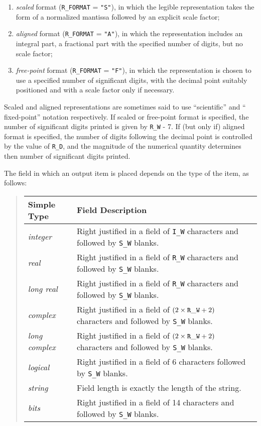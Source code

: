 \documentclass[a4paper]{article}
\def\A{\lstinline[language=AlgolW,style=ReferenceManual]}
\def\T#1{\textit{#1}}
\begin{document}
\begin{enumerate}[(1)]
\item \emph{scaled} format (\A!R_FORMAT! = \A!"S"!), in which the
  legible representation takes the form of a normalized mantissa
  followed by an explicit scale factor;
\item \emph{aligned} format (\A!R_FORMAT! = \A!"A"!), in which the
  representation includes an integral part, a fractional part with the
  specified number of digits, but no scale factor;
\item \emph{free-point} format (\A!R_FORMAT! = \A!"F"!), in which the
  representation is chosen to use a specified number of significant
  digits, with the decimal point suitably positioned and with a scale
  factor only if necessary.
\end{enumerate}

Scaled and aligned representations are sometimes said to use
``scientific'' and `` fixed-point'' notation respectively. If scaled
or free-point format is specified, the number of significant digits
printed is given by \A!R_W! - 7. If (but only if) aligned format is
specified, the number of digits following the decimal point is
controlled by the value of \A!R_D!, and the magnitude of the numerical
quantity determines then number of significant digits printed.

The field in which an output item is placed depends on the type of the item, as follows:

\begin{quote}
\begin{tabular}{l|p{3.5in}}
Simple Type           & Field Description \\
\hline
\T{integer}      & Right justified in a field of \A!I_W! characters and followed by \A!S_W! blanks. \\
\T{real}         & Right justified in a field of \A!R_W! characters and followed by \A!S_W! blanks. \\
\T{long real}    & Right justified in a field of \A!R_W! characters and followed by \A!S_W! blanks. \\
\T{complex}      & Right justified in a field of $(2 \times {\tt R\_W} + 2)$ characters and followed by \A!S_W! blanks.\\
\T{long complex} & Right justified in a field of $(2 \times {\tt R\_W} + 2)$ characters and followed by \A!S_W! blanks.\\
\T{logical}      & Right justified in a field of 6 characters followed by  \A!S_W! blanks. \\
\T{string}       & Field length is exactly the length of the string. \\
\T{bits}         & Right justified in a field of 14 characters and followed by \A!S_W! blanks. 
\end{tabular}
\end{quote}
\end{document}
